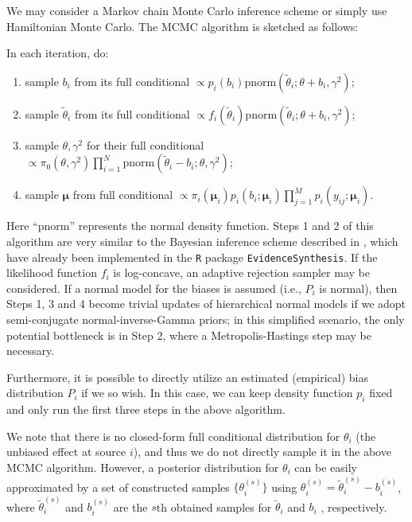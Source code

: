 \documentclass{article}
\begin{document}
We may consider a Markov chain Monte Carlo inference scheme or simply use Hamiltonian Monte Carlo. The MCMC algorithm is sketched as follows:

In each iteration, do:
\begin{enumerate}
    \item sample $b_i$ from its full conditional $\propto p_i(b_i)\text{pnorm}(\tilde\theta_i; \theta+b_i, \gamma^2)$;
    \item sample $\tilde\theta_i$ from its full conditional $\propto f_i(\tilde\theta_i)\text{pnorm}(\tilde\theta_i; \theta+b_i, \gamma^2)$;
    \item sample $\theta, \gamma^2$ for their full conditional $\propto \pi_0(\theta, \gamma^2) \prod_{i=1}^N \text{pnorm}(\tilde\theta_i-b_i; \theta, \gamma^2)$;
    \item sample $\boldsymbol\mu$ from full conditional $\propto \pi_i(\boldsymbol\mu_i) p_i(b_i; \boldsymbol\mu_i) \prod_{j=1}^M p_i(y_{ij}; \boldsymbol\mu_i)$.
\end{enumerate}
Here ``$\text{pnorm}$'' represents the normal density function.
Steps 1 and 2 of this algorithm are very similar to the Bayesian inference scheme described in \cite{schuemie2021combining}, which have already been implemented in the \texttt{R} package \texttt{EvidenceSynthesis}. If the likelihood function $f_i$ is log-concave, an adaptive rejection sampler \citep{gilks1992adaptive} may be considered. 
If a normal model for the biases is assumed (i.e., $P_i$ is normal),
then Steps 1, 3 and 4 become trivial updates of hierarchical normal models if we adopt semi-conjugate normal-inverse-Gamma priors;
in this simplified scenario, the only potential bottleneck is in Step 2, where a Metropolis-Hastings step may be necessary.

Furthermore, it is possible to directly utilize an estimated (empirical) bias distribution $P_i$ if we so wish.
In this case, we can keep density function $p_i$ fixed and only run the first three steps in the above algorithm.

We note that there is no closed-form full conditional distribution for $\theta_i$ (the unbiased effect at source $i$), and thus we do not directly sample it in the above MCMC algorithm. 
However, a posterior distribution for $\theta_i$ can be easily approximated by a set of constructed samples $\{\theta_i^{(s)}\}$ using $\theta_i^{(s)} = \tilde\theta_i^{(s)} - b_i^{(s)}$, 
where $\tilde\theta_i^{(s)}$ and $b_i^{(s)}$ are the $s$th obtained samples for $\tilde\theta_i$ and $b_i$ , respectively. 
\end{document}
